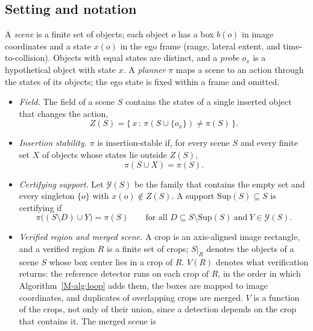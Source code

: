 \documentclass[10pt,letterpaper]{article}
\newcommand{\Sup}{\mathrm{Sup}}
\newcommand{\field}{Z}
\newcommand{\policy}{\pi}
\theoremstyle{remark}
\theoremstyle{plain}
\theoremstyle{definition}
\newcommand{\mrefnum}[1]{\ref*{M-#1}}
\begin{document}
\subsection{Setting and notation}
\label{sec:setting_supp}

A \emph{scene} is a finite set of objects; each object $o$ has a box $b(o)$ in image coordinates and a state $x(o)$ in the ego frame (range, lateral extent, and time-to-collision).
Objects with equal states are distinct, and a \emph{probe} $o_x$ is a hypothetical object with state $x$.
A \emph{planner} $\policy$ maps a scene to an action through the states of its objects; the ego state is fixed within a frame and omitted.

\begin{itemize}
\item \emph{Field.} The field of a scene $S$ contains the states of a single inserted object that changes the action,
\begin{equation}
\field(S)=\{\,x \,:\, \policy(S\cup\{o_x\})\neq\policy(S)\,\}.
\label{eq:s_field}
\end{equation}
\item \emph{Insertion stability.} $\policy$ is insertion-stable if, for every scene $S$ and every finite set $X$ of objects whose states lie outside $\field(S)$,
\begin{equation}
\policy(S\cup X)=\policy(S).
\label{eq:s_insertion}
\end{equation}
\item \emph{Certifying support.} Let $\mathcal{Y}(S)$ be the family that contains the empty set and every singleton $\{o\}$ with $x(o)\notin\field(S)$. A support $\Sup(S)\subseteq S$ is certifying if
\begin{equation}
\policy\big((S\setminus D)\cup Y\big)=\policy(S)\qquad\text{for all } D\subseteq S\setminus\Sup(S)\ \text{and}\ Y\in\mathcal{Y}(S).
\label{eq:s_support}
\end{equation}
\item \emph{Verified region and merged scene.} A crop is an axis-aligned image rectangle, and a verified region $R$ is a finite set of crops; $S|_R$ denotes the objects of a scene $S$ whose box center lies in a crop of $R$.
$V(R)$ denotes what verification returns: the reference detector runs on each crop of $R$, in the order in which Algorithm~\mrefnum{alg:loop} adds them, the boxes are mapped to image coordinates, and duplicates of overlapping crops are merged.
$V$ is a function of the crops, not only of their union, since a detection depends on the crop that contains it. The merged scene is

\end{itemize}
\end{document}
